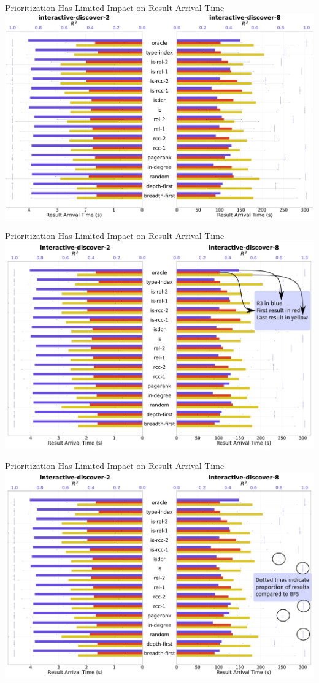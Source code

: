 \begin{frame}{Prioritization Has Limited Impact on Result Arrival Time}
      \centering
    \includegraphics[width=.82\linewidth]{images/combined_r3_timings_plot_non_relative_reduced_test.pdf} %
\end{frame}
\begin{frame}{Prioritization Has Limited Impact on Result Arrival Time}
    \centering
    \includegraphics[width=.82\linewidth]{images/plot_color_annotated.pdf} %
\end{frame}
\begin{frame}{Prioritization Has Limited Impact on Result Arrival Time}
    \centering
    \includegraphics[width=.82\linewidth]{images/plot_dotted_annotated.pdf} %
\end{frame}
